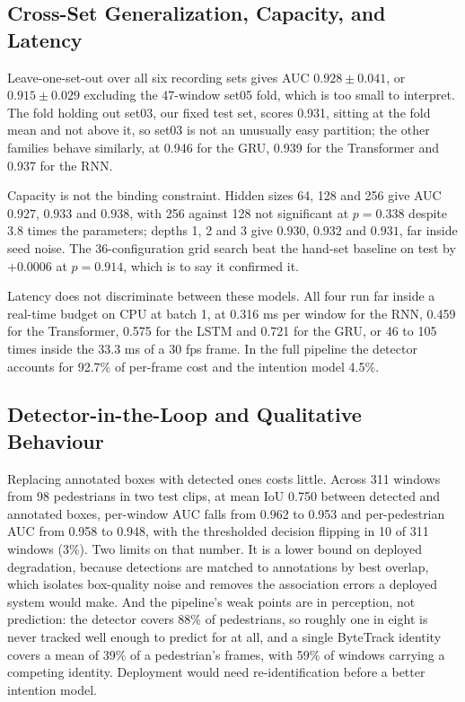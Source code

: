 \documentclass[mti,article,submit,moreauthors]{Definitions/mdpi}
\begin{document}
\subsection{Cross-Set Generalization, Capacity, and Latency}

Leave-one-set-out over all six recording sets gives AUC $0.928 \pm 0.041$, or $0.915 \pm 0.029$ excluding the 47-window set05 fold, which is too small to interpret. The fold holding out set03, our fixed test set, scores 0.931, sitting at the fold mean and not above it, so set03 is not an unusually easy partition; the other families behave similarly, at 0.946 for the GRU, 0.939 for the Transformer and 0.937 for the RNN.

Capacity is not the binding constraint. Hidden sizes 64, 128 and 256 give AUC $0.927$, $0.933$ and $0.938$, with 256 against 128 not significant at $p = 0.338$ despite 3.8 times the parameters; depths 1, 2 and 3 give $0.930$, $0.932$ and $0.931$, far inside seed noise. The 36-configuration grid search beat the hand-set baseline on test by $+0.0006$ at $p = 0.914$, which is to say it confirmed it.

Latency does not discriminate between these models. All four run far inside a real-time budget on CPU at batch 1, at 0.316 ms per window for the RNN, 0.459 for the Transformer, 0.575 for the LSTM and 0.721 for the GRU, or 46 to 105 times inside the 33.3 ms of a 30 fps frame. In the full pipeline the detector accounts for 92.7\% of per-frame cost and the intention model 4.5\%.

\subsection{Detector-in-the-Loop and Qualitative Behaviour}

Replacing annotated boxes with detected ones costs little. Across 311 windows from 98 pedestrians in two test clips, at mean IoU 0.750 between detected and annotated boxes, per-window AUC falls from 0.962 to 0.953 and per-pedestrian AUC from 0.958 to 0.948, with the thresholded decision flipping in 10 of 311 windows (3\%). Two limits on that number. It is a lower bound on deployed degradation, because detections are matched to annotations by best overlap, which isolates box-quality noise and removes the association errors a deployed system would make. And the pipeline's weak points are in perception, not prediction: the detector covers 88\% of pedestrians, so roughly one in eight is never tracked well enough to predict for at all, and a single ByteTrack identity covers a mean of 39\% of a pedestrian's frames, with 59\% of windows carrying a competing identity. Deployment would need re-identification before a better intention model.
\end{document}
